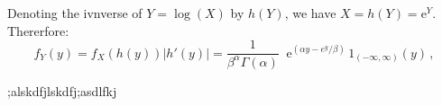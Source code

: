 \documentclass[12pt]{article}
\begin{document}
Denoting the ivnverse of $Y = \log (X)$ by $h(Y)$, we have $ X=h(Y)=\mathrm{e}^Y$. Thererfore:
$$
 f_Y(y) = f_X(h(y)) |h'(y)| = \frac{1}{\beta^\alpha \Gamma(\alpha)} \;\; \mathrm{e}^{\left(\alpha y - e^y/\beta\right)}\,1_{(-\infty,\infty)}(y) \, ,
$$




;alskdfjlskdfj;asdlfkj
\end{document}
